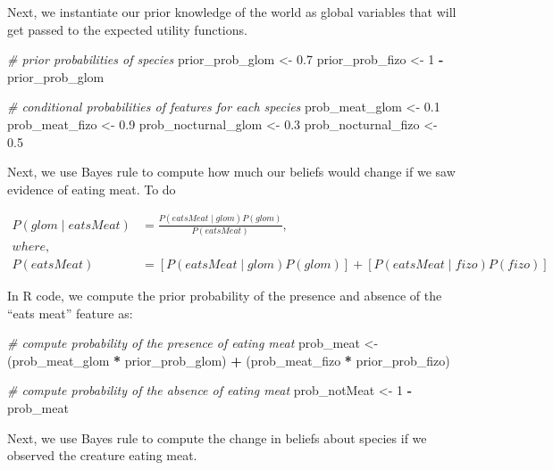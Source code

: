 \documentclass[english,floatsintext,man]{apa6}
\newenvironment{Shaded}{\begin{snugshade}}{\end{snugshade}}
\newcommand{\DecValTok}[1]{\textcolor[rgb]{0.00,0.00,0.81}{#1}}
\newcommand{\FloatTok}[1]{\textcolor[rgb]{0.00,0.00,0.81}{#1}}
\newcommand{\StringTok}[1]{\textcolor[rgb]{0.31,0.60,0.02}{#1}}
\newcommand{\CommentTok}[1]{\textcolor[rgb]{0.56,0.35,0.01}{\textit{#1}}}
\newcommand{\OperatorTok}[1]{\textcolor[rgb]{0.81,0.36,0.00}{\textbf{#1}}}
\newcommand{\NormalTok}[1]{#1}
\theoremstyle{definition}
\theoremstyle{definition}
\theoremstyle{definition}
\theoremstyle{remark}
\begin{document}
Next, we instantiate our prior knowledge of the world as global
variables that will get passed to the expected utility functions.

\begin{Shaded}
\begin{Highlighting}[]
\CommentTok{# prior probabilities of species}
\NormalTok{prior_prob_glom <-}\StringTok{ }\FloatTok{0.7}
\NormalTok{prior_prob_fizo <-}\StringTok{ }\DecValTok{1} \OperatorTok{-}\StringTok{ }\NormalTok{prior_prob_glom}

\CommentTok{# conditional probabilities of features for each species}
\NormalTok{prob_meat_glom <-}\StringTok{ }\FloatTok{0.1}
\NormalTok{prob_meat_fizo <-}\StringTok{ }\FloatTok{0.9}
\NormalTok{prob_nocturnal_glom <-}\StringTok{ }\FloatTok{0.3}
\NormalTok{prob_nocturnal_fizo <-}\StringTok{ }\FloatTok{0.5}
\end{Highlighting}
\end{Shaded}

\noindent
Next, we use Bayes rule to compute how much our beliefs would change if
we saw evidence of eating meat. To do

\[
\begin{aligned}
P(glom \mid eatsMeat) &= \frac{P(eatsMeat \mid glom)P(glom)}{P(eatsMeat)},\\
where,\\
P(eatsMeat) &= [P(eatsMeat \mid glom)P(glom)] + [P(eatsMeat \mid fizo)P(fizo)]
\end{aligned}
\]

\noindent
In R code, we compute the prior probability of the presence and absence
of the \enquote{eats meat} feature as:

\begin{Shaded}
\begin{Highlighting}[]
\CommentTok{# compute probability of the presence of eating meat}
\NormalTok{prob_meat <-}\StringTok{ }\NormalTok{(prob_meat_glom }\OperatorTok{*}\StringTok{ }\NormalTok{prior_prob_glom) }\OperatorTok{+}\StringTok{ }
\StringTok{  }\NormalTok{(prob_meat_fizo }\OperatorTok{*}\StringTok{ }\NormalTok{prior_prob_fizo)}

\CommentTok{# compute probability of the absence of eating meat}
\NormalTok{prob_notMeat <-}\StringTok{ }\DecValTok{1} \OperatorTok{-}\StringTok{ }\NormalTok{prob_meat}
\end{Highlighting}
\end{Shaded}

\noindent
Next, we use Bayes rule to compute the change in beliefs about species
if we observed the creature eating meat.
\end{document}

